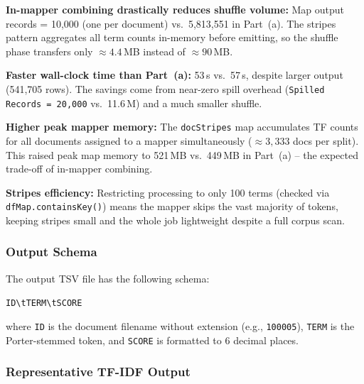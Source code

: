 \documentclass[12pt,a4paper]{article}
\begin{document}
\begin{insightbox}
\textbf{In-mapper combining drastically reduces shuffle volume:}
Map output records = 10,000 (one per document) vs.\ 5,813,551 in Part~(a).
The stripes pattern aggregates all term counts in-memory before emitting, so
the shuffle phase transfers only $\approx 4.4$\,MB instead of $\approx 90$\,MB.

\textbf{Faster wall-clock time than Part~(a):}
53\,s vs.\ 57\,s, despite larger output (541,705 rows).  The savings come from
near-zero spill overhead (\texttt{Spilled Records = 20,000} vs.\ 11.6\,M)
and a much smaller shuffle.

\textbf{Higher peak mapper memory:}
The \texttt{docStripes} map accumulates TF counts for all documents assigned
to a mapper simultaneously ($\approx 3{,}333$ docs per split).  This raised
peak map memory to 521\,MB vs.\ 449\,MB in Part~(a) -- the expected trade-off
of in-mapper combining.

\textbf{Stripes efficiency:}
Restricting processing to only 100 terms (checked via
\texttt{dfMap.containsKey()}) means the mapper skips the vast majority of
tokens, keeping stripes small and the whole job lightweight despite a full
corpus scan.
\end{insightbox}

\subsubsection{Output Schema}

The output TSV file has the following schema:

\begin{center}
\texttt{ID\textbackslash tTERM\textbackslash tSCORE}
\end{center}

where \texttt{ID} is the document filename without extension (e.g.,
\texttt{100005}), \texttt{TERM} is the Porter-stemmed token, and \texttt{SCORE}
is formatted to 6 decimal places.

\subsubsection{Representative TF-IDF Output}
\end{document}

